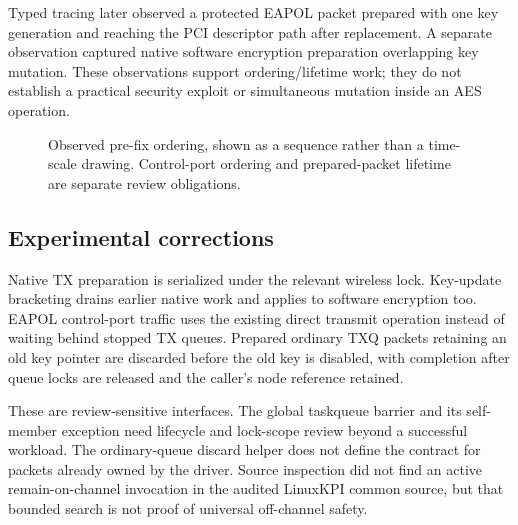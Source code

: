 \documentclass[11pt,letterpaper,oneside]{article}
\begin{document}
Typed tracing later observed a protected EAPOL packet prepared with one key generation and reaching the PCI descriptor path after replacement. A separate observation captured native software encryption preparation overlapping key mutation. These observations support ordering/lifetime work; they do not establish a practical security exploit or simultaneous mutation inside an AES operation.

\begin{figure}[H]\centering
{}\caption{Observed pre-fix ordering, shown as a sequence rather than a time-scale drawing. Control-port ordering and prepared-packet lifetime are separate review obligations.}\end{figure}

\subsection{Experimental corrections}
Native TX preparation is serialized under the relevant wireless lock. Key-update bracketing drains earlier native work and applies to software encryption too. EAPOL control-port traffic uses the existing direct transmit operation instead of waiting behind stopped TX queues. Prepared ordinary TXQ packets retaining an old key pointer are discarded before the old key is disabled, with completion after queue locks are released and the caller's node reference retained.

These are review-sensitive interfaces. The global taskqueue barrier and its self-member exception need lifecycle and lock-scope review beyond a successful workload. The ordinary-queue discard helper does not define the contract for packets already owned by the driver. Source inspection did not find an active remain-on-channel invocation in the audited LinuxKPI common source, but that bounded search is not proof of universal off-channel safety.
\end{document}
